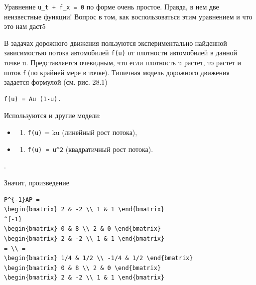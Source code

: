 \documentclass[
  ukrainian,
]{article}
\providecommand{\tightlist}{%
  \setlength{\itemsep}{0pt}\setlength{\parskip}{0pt}}
\begin{document}
Уравнение \texttt{u\_t\ +\ f\_x\ =\ 0} по форме очень простое. Правда, в
нем две неизвестные функции! Вопрос в том, как воспользоваться этим
уравнением и что это нам даст5

В задачах дорожного движения пользуются экспериментально найденной
зависимостью потока автомобилей \texttt{f(u)} от плотности автомобилей в
данной точке u. Представляется очевидным, что если плотность u растет,
то растет и поток f (по крайней мере в точке). Типичная модель дорожного
движения задается формулой (см. рис. 28.1)

\begin{verbatim}
f(u) = Au (1-u).
\end{verbatim}

Используются и другие модели:

\begin{itemize}
\tightlist
\item
  \begin{enumerate}
  \def\labelenumi{\arabic{enumi})}
  \tightlist
  \item
    \texttt{f(u)} = ku (линейный рост потока),
  \end{enumerate}
\item
  \begin{enumerate}
  \def\labelenumi{\arabic{enumi})}
  \setcounter{enumi}{1}
  \tightlist
  \item
    \texttt{f(u)\ =\ u\^{}2} (квадратичный рост потока).
  \end{enumerate}
\end{itemize}

.

Значит, произведение

\begin{verbatim}
P^{-1}AP =
\begin{bmatrix} 2 & -2 \\ 1 & 1 \end{bmatrix}
^{-1}
\begin{bmatrix} 0 & 8 \\ 2 & 0 \end{bmatrix}
\begin{bmatrix} 2 & -2 \\ 1 & 1 \end{bmatrix}
= \\ =
\begin{bmatrix} 1/4 & 1/2 \\ -1/4 & 1/2 \end{bmatrix}
\begin{bmatrix} 0 & 8 \\ 2 & 0 \end{bmatrix}
\begin{bmatrix} 2 & -2 \\ 1 & 1 \end{bmatrix}
\end{verbatim}
\end{document}
